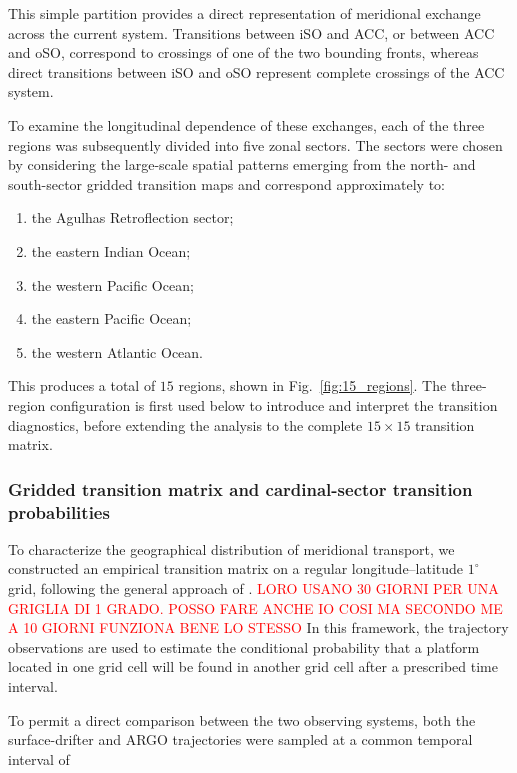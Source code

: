 \documentclass[
  draft
]{agujournal2025}
\begin{document}
            This simple partition provides a direct representation of meridional exchange across the current system. Transitions between iSO and ACC, or between ACC and oSO, correspond to crossings of one of the two bounding fronts, whereas direct transitions between iSO and oSO represent complete crossings of the ACC system.
            
            To examine the longitudinal dependence of these exchanges, each of the three regions was subsequently divided into five zonal sectors. The sectors were chosen by considering the large-scale spatial patterns emerging from the north- and south-sector gridded transition maps and correspond approximately to:
            \begin{enumerate}
                \item the Agulhas Retroflection sector;
                \item the eastern Indian Ocean;
                \item the western Pacific Ocean;
                \item the eastern Pacific Ocean;
                \item the western Atlantic Ocean.
            \end{enumerate}
            This produces a total of $15$ regions, shown in Fig.~\ref{fig:15_regions}. The three-region configuration is first used below to introduce and interpret the transition diagnostics, before extending the analysis to the complete $15\times15$ transition matrix.

        \subsubsection{Gridded transition matrix and cardinal-sector transition probabilities}
            \label{sec:gridded_transition_matrix}

            To characterize the geographical distribution of meridional transport, we constructed an empirical transition matrix on a regular longitude--latitude $1^{\circ}$ grid, following the general approach of \cite{art:sevellec2017, art:chamberlain2023}. \textcolor{red}{LORO USANO 30 GIORNI PER UNA GRIGLIA DI 1 GRADO. POSSO FARE ANCHE IO COSI MA SECONDO ME A 10 GIORNI FUNZIONA BENE LO STESSO} In this framework, the trajectory observations are used to estimate the conditional probability that a platform located in one grid cell will be found in another grid cell after a prescribed time interval.

            To permit a direct comparison between the two observing systems, both the surface-drifter and ARGO trajectories were sampled at a common temporal interval of
            
\end{document}
